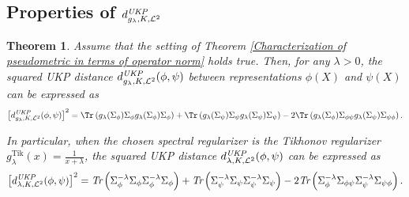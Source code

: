 \documentclass{article} %
\newcommand{\repone}{\phi}
\newcommand{\reptwo}{\psi}
\newcommand{\Sone}{\Sigma_{\repone}}
\newcommand{\Stwo}{\Sigma_{\reptwo}}
\newcommand{\Sonetwo}{\Sigma_{\repone \reptwo}}
\newcommand{\Stwoone}
{\Sigma_{\reptwo \repone}}
\newcommand{\gl}{g_{\lambda}}
\newcommand{\glTik}{\gl^{\operatorname{Tik}}}
\newcommand{\metricstname}{UKP }
\newcommand{\dtwo}{d_{\lambda,K,\mathcal{L}^{2}}^{\emph{\metricstname}}}
\newcommand{\dtwogl}{d_{\gl,K,\mathcal{L}^{2}}^{\emph{\metricstname}}}
\theoremstyle{plain}
\newcounter{theoremno}
\newtheorem{theorem}[theoremno]{Theorem}
\begin{document}
\subsection{Properties of $\dtwogl$}\label{Properties of dtwo}

\begin{theorem}\label{Squared dtwo pseudometric using trace operators general case}
    Assume that the setting of Theorem \ref{Characterization of pseudometric in terms of operator norm} holds true. Then, 
    for any $\lambda>0$, the squared \emph{\metricstname} distance $\dtwogl(\repone,\reptwo)$ between representations $\repone(X)$ and $\reptwo(X)$ can be expressed as
    \[
\begin{aligned}
        \left[\dtwogl(\repone,\reptwo)\right]^{2}
        = \Tr\left(\gl(\Sone)\Sone\gl(\Sone)\Sone\right) + \Tr\left(\gl(\Stwo)\Stwo\gl(\Stwo)\Stwo\right)-2\Tr\left(\gl(\Sone)\Sonetwo\gl(\Stwo)\Stwoone\right).
    \end{aligned}
    \]

    In particular, when the chosen spectral regularizer is the Tikhonov regularizer $\glTik(x) = \frac{1}{x+\lambda}$, the squared UKP distance $ \dtwo(\repone,\reptwo)$ can be expressed as 
    \[
\begin{aligned}
        \left[\dtwo(\repone,\reptwo)\right]^{2}
        = \emph{Tr}\left(\Sigma_{\repone}^{-\lambda}\Sigma_{\repone}\Sigma_{\repone}^{-\lambda}\Sigma_{\repone}\right) + \emph{Tr}\left(\Sigma_{\reptwo}^{-\lambda}\Sigma_{\reptwo}\Sigma_{\reptwo}^{-\lambda}\Sigma_{\reptwo}\right)-2\emph{Tr}\left(\Sigma_{\repone}^{-\lambda}\Sigma_{\repone\reptwo}\Sigma_{\reptwo}^{-\lambda}\Sigma_{\reptwo\repone}\right).
    \end{aligned}
    \]
    
\end{theorem}
\end{document}
